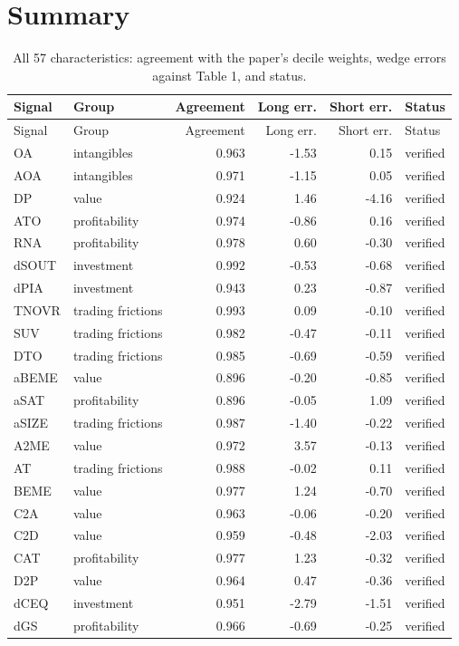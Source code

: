 \documentclass[11pt]{article}
\newcommand{\ok}{\textcolor{black!60}{verified}}
\begin{document}
\section*{Summary}
{\small
\begin{longtable}{llrrrl}
\caption{All 57 characteristics: agreement with the paper's decile weights, wedge errors against Table 1, and status.}\\
\toprule
Signal & Group & Agreement & Long err. & Short err. & Status\\
\midrule
\endfirsthead
\toprule
Signal & Group & Agreement & Long err. & Short err. & Status\\
\midrule
\endhead
OA & intangibles & 0.963 & -1.53 & 0.15 & \ok\\
AOA & intangibles & 0.971 & -1.15 & 0.05 & \ok\\
DP & value & 0.924 & 1.46 & -4.16 & \ok\\
ATO & profitability & 0.974 & -0.86 & 0.16 & \ok\\
RNA & profitability & 0.978 & 0.60 & -0.30 & \ok\\
dSOUT & investment & 0.992 & -0.53 & -0.68 & \ok\\
dPIA & investment & 0.943 & 0.23 & -0.87 & \ok\\
TNOVR & trading frictions & 0.993 & 0.09 & -0.10 & \ok\\
SUV & trading frictions & 0.982 & -0.47 & -0.11 & \ok\\
DTO & trading frictions & 0.985 & -0.69 & -0.59 & \ok\\
aBEME & value & 0.896 & -0.20 & -0.85 & \ok\\
aSAT & profitability & 0.896 & -0.05 & 1.09 & \ok\\
aSIZE & trading frictions & 0.987 & -1.40 & -0.22 & \ok\\
A2ME & value & 0.972 & 3.57 & -0.13 & \ok\\
AT & trading frictions & 0.988 & -0.02 & 0.11 & \ok\\
BEME & value & 0.977 & 1.24 & -0.70 & \ok\\
C2A & value & 0.963 & -0.06 & -0.20 & \ok\\
C2D & value & 0.959 & -0.48 & -2.03 & \ok\\
CAT & profitability & 0.977 & 1.23 & -0.32 & \ok\\
D2P & value & 0.964 & 0.47 & -0.36 & \ok\\
dCEQ & investment & 0.951 & -2.79 & -1.51 & \ok\\
dGS & profitability & 0.966 & -0.69 & -0.25 & \ok\\

\end{longtable}}
\end{document}
